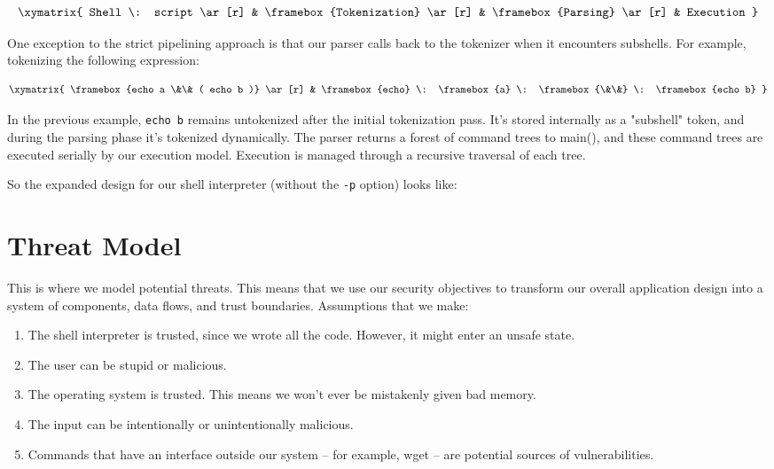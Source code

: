 \documentclass[12pt]{article}
\begin{document}
\begin{displaymath}
\xymatrix{
Shell \: script \ar[r] & \framebox{Tokenization} \ar[r] & \framebox{Parsing} \ar[r] & Execution
}
\end{displaymath}

One exception to the strict pipelining approach is that our parser calls back to the tokenizer when it encounters subshells. For example, tokenizing the following expression:

\begin{displaymath}
\xymatrix{
\framebox{echo a \&\& ( echo b )} \ar[r] & \framebox{echo} \: \framebox{a} \: \framebox{\&\&} \: \framebox{echo	 b}
}
\end{displaymath}

In the previous example, \texttt{echo b} remains untokenized after the initial tokenization pass. It's stored internally as a "subshell" token, and during the parsing phase it's tokenized dynamically. The parser returns a forest of command trees to main(), and these command trees are executed serially by our execution model. Execution is managed through a recursive traversal of each tree.

So the expanded design for our shell interpreter (without the \texttt{-p} option) looks like: \\


\section{Threat Model}
This is where we model potential threats. This means that we use our security objectives to transform our overall application design into a system of components, data flows, and trust boundaries. Assumptions that we make:

\begin{enumerate}
	\item The shell interpreter is trusted, since we wrote all the code. However, it might enter an unsafe state.
	\item The user can be stupid or malicious.
	\item The operating system is trusted. This means we won't ever be mistakenly given bad memory.
	\item The input can be intentionally or unintentionally malicious.
	\item Commands that have an interface outside our system -- for example, wget -- are potential sources of vulnerabilities.
\end{enumerate}
\end{document}
